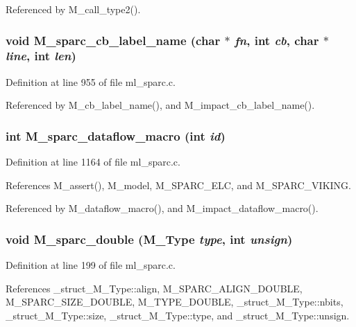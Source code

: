 Referenced by M\_\-call\_\-type2().
\subsubsection{\setlength{\rightskip}{0pt plus 5cm}void M\_\-sparc\_\-cb\_\-label\_\-name (char $\ast$ {\em fn}, int {\em cb}, char $\ast$ {\em line}, int {\em len})}\label{ml__sparc_8c_0e0d71293d516c0e226739b8dcd27341}




Definition at line 955 of file ml\_\-sparc.c.

Referenced by M\_\-cb\_\-label\_\-name(), and M\_\-impact\_\-cb\_\-label\_\-name().
\subsubsection{\setlength{\rightskip}{0pt plus 5cm}int M\_\-sparc\_\-dataflow\_\-macro (int {\em id})}\label{ml__sparc_8c_88caba43c7f023b5c5ec4e5a2f842f3b}




Definition at line 1164 of file ml\_\-sparc.c.

References M\_\-assert(), M\_\-model, M\_\-SPARC\_\-ELC, and M\_\-SPARC\_\-VIKING.

Referenced by M\_\-dataflow\_\-macro(), and M\_\-impact\_\-dataflow\_\-macro().
\subsubsection{\setlength{\rightskip}{0pt plus 5cm}void M\_\-sparc\_\-double (\bf{M\_\-Type} {\em type}, int {\em unsign})}\label{ml__sparc_8c_0cd8a913d9be6dcc0756cf3d8dfb5f26}




Definition at line 199 of file ml\_\-sparc.c.

References \_\-struct\_\-M\_\-Type::align, M\_\-SPARC\_\-ALIGN\_\-DOUBLE, M\_\-SPARC\_\-SIZE\_\-DOUBLE, M\_\-TYPE\_\-DOUBLE, \_\-struct\_\-M\_\-Type::nbits, \_\-struct\_\-M\_\-Type::size, \_\-struct\_\-M\_\-Type::type, and \_\-struct\_\-M\_\-Type::unsign.

